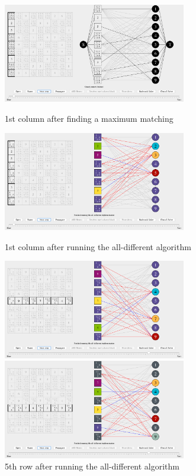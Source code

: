 \documentclass{l4proj}
\begin{document}
\begin{figure}[H]
\begin{minipage}{8.0cm}
\centering
\includegraphics[width=8cm]{images/proof_of_concept/screenshot1.png}
\caption{1st column after finding a maximum matching}
\label{screenshot1}
\end{minipage}%
\hfill
\begin{minipage}{8.0cm}
\centering
\includegraphics[width=8cm]{images/proof_of_concept/screenshot2.png}
\caption{1st column after running the all-different algorithm}
\label{screenshot2}
\end{minipage}%
\vspace*{1cm}
\begin{minipage}{8.0cm}
\centering
\includegraphics[width=8cm]{images/proof_of_concept/screenshot3.png}
\caption{5th row after running the all-different algorithm}
\label{screenshot3}
\end{minipage}%
\hfill
\begin{minipage}{8.0cm}
\centering
\includegraphics[width=8cm]{images/proof_of_concept/screenshot4.png}

\end{minipage}
\end{figure}
\end{document}
